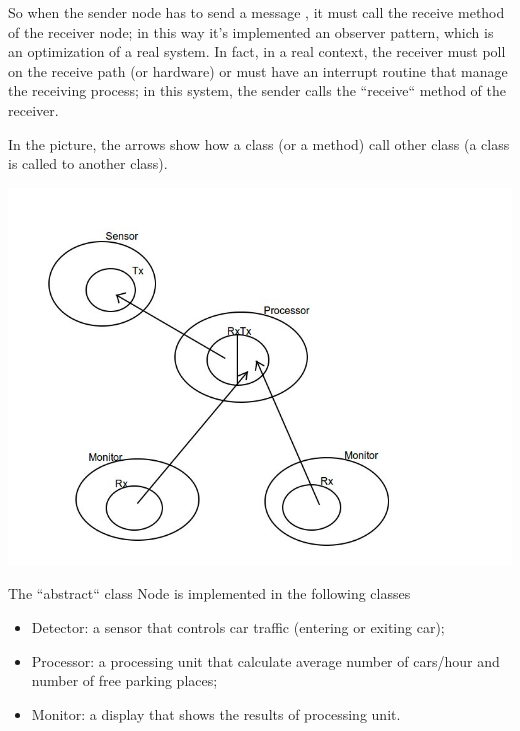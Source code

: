 \documentclass[a4paper,titlepage]{article}
\begin{document}
So when the sender node has to send a message , it must call the receive method of the receiver node; in this way it's implemented an observer pattern, which is an optimization of a real system. In fact, in a real context, the receiver must poll on the receive path (or hardware) or must have an interrupt routine that manage the receiving process; in this system, the sender calls the ``receive`` method of the receiver.

In the picture, the arrows show how a class (or a method) call other class (a class is called to another class).

    \begin{center}

    \centering
    \includegraphics[scale=0.40]{pattern.jpg}

    \end{center}


The ``abstract`` class Node is implemented in the following classes

\begin{itemize}[noitemsep,topsep=20pt,parsep=10pt,partopsep=20pt]

\item Detector: a sensor that controls car traffic (entering or exiting car);
\item Processor: a processing unit that calculate average number of cars/hour and number of free parking places;
\item Monitor: a display that shows the results of processing unit.

\end{itemize}
\end{document}
